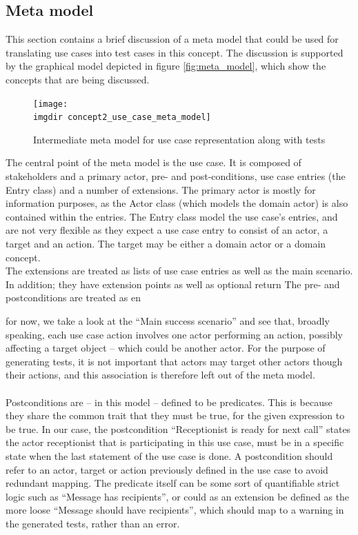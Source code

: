 \subsection{Meta model}
This section contains a brief discussion of a meta model that could be used for translating use cases into test cases in this concept. The discussion is supported by the graphical model depicted in figure \ref{fig:meta_model}, which show the concepts that are being discussed.

\begin{figure}[h]
  \centering
 
  \texttt{[image: \\imgdir concept2\_use\_case\_meta\_model]}
  \caption{Intermediate meta model for use case representation along with tests}
  \label{fig:use_case_meta_model}
\end{figure}

The central point of the meta model is the use case. It is composed of stakeholders and a primary actor, pre- and post-conditions, use case entries (the Entry class) and a number of extensions. The primary actor is mostly for information purposes, as the Actor class (which models the domain actor) is also contained within the entries. The Entry class model the use case's entries, and are not very flexible as they expect a use case entry to consist of an actor, a target and an action. The target may be either a domain actor or a domain concept.\\
The extensions are treated as lists of use case entries as well as the main scenario. In addition; they have extension points as well as optional return
The pre- and postconditions are treated as en



for now, we take a look at the ``Main success scenario'' and see that, broadly speaking, each use case action involves one actor performing an action, possibly affecting a target object -- which could be another actor. For the purpose of generating tests, it is not important that actors may target other actors though their actions, and this association is therefore left out of the meta model.\\\\
Postconditions are -- in this model -- defined to be predicates. This is because they share the common trait that they must be true, for the given expression to be true. In our case, the postcondition ``Receptionist is ready for next call'' states the actor receptionist that is participating in this use case, must be in a specific state when the last statement of the use case is done. A postcondition should refer to an actor, target or action previously defined in the use case to avoid redundant mapping. The predicate itself can be some sort of quantifiable strict logic such as ``Message has recipients'', or could as an extension be defined as the more loose ``Message should have recipients'', which should map to a warning in the generated tests, rather than an error.


